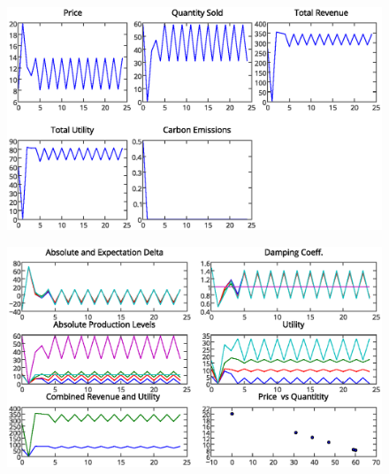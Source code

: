\documentclass[12pt]{article}
\begin{document}
		\begin{figure}[ht!]
			\begin{center}
			\includegraphics[scale = .6]{5playertotals.eps}
			\end{center}
		\end{figure}


		\begin{figure}[ht!]
			\begin{center}
			\includegraphics[scale = .6]{5player.eps}
			\end{center}
		\end{figure}




\newpage
\end{document}
